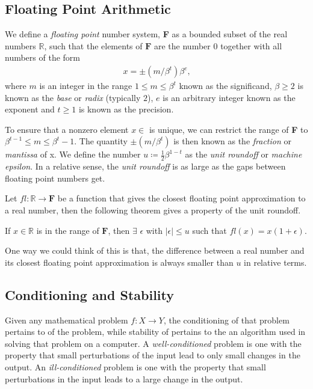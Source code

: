 \subsection{Floating Point Arithmetic}

We define a \textit{floating point} number system, \textbf{F} as a bounded subset of the real numbers $\mathbb{R}$, such that the elements of $\mathbf{F}$ are the number $0$ together with all numbers of the form
\begin{align*}
	x = \pm(m / \beta^t)\beta^e\text{{,}}
\end{align*}
where $m$ is an integer in the range $1\leq m\leq \beta^t$ known as the significand, $\beta \geq 2$ is known as the \textit{base} or \textit{radix} (typically $2$), $e$ is an arbitrary integer known as the exponent and $t\geq 1$ is known as the precision.

To ensure that a nonzero element $x \in$  is unique, we can restrict the range of \textbf{F} to $\beta^{t-1} \leq m \leq \beta^t - 1$. The quantity $\pm(m/\beta^t)$ is then known as the \textit{fraction} or \textit{mantissa} of x. We define the number $u \coloneq \frac{1}{2}\beta^{1-t}$ as the \textit{unit roundoff} or \textit{machine epsilon}. In a relative sense, the \textit{unit roundoff} is as large as the gaps between floating point numbers get.

Let $fl :  \mathbb{R} \rightarrow \mathbf{F}$ be a function that gives the closest floating point approximation to a real number, then the following theorem gives a property of the unit roundoff.
\begin{theorem}
	If $x \in \mathbb{R}$ is in the range of $\mathbf{F}$, then $\exists$ $\epsilon$ with $|\epsilon| \le u$ such that $fl(x) = x(1+\epsilon)$.
\end{theorem}
One way we could think of this is that, the difference between a real number and its closest floating point approximation is always smaller than $u$ in relative terms.

\subsection{Conditioning and Stability}\label{sec:ConditioningAndStability}

Given any mathematical problem $f: X \rightarrow Y$, the conditioning of that problem pertains to  of the problem, while stability of  pertains to the  an algorithm used in solving that problem on a computer. A \textit{well-conditioned} problem is one with the property that small perturbations of the input lead to only small changes in the output. An \textit{ill-conditioned} problem is one with the property that small perturbations in the input leads to a large change in the output.

